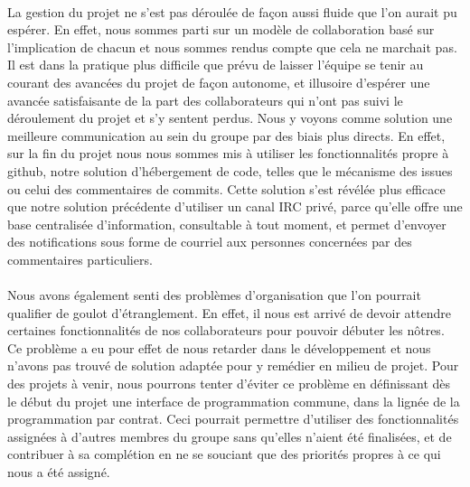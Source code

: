     \paragraph{}
        La gestion du projet ne s'est pas déroulée de façon aussi fluide que 
        l'on aurait pu espérer. En effet, nous sommes parti sur un modèle de 
        collaboration basé sur l'implication de chacun et nous sommes rendus
        compte que cela ne marchait pas. Il est dans la pratique plus difficile
        que prévu de laisser l'équipe se tenir au courant des avancées du
        projet de façon autonome, et illusoire d'espérer une avancée 
        satisfaisante de la part des collaborateurs qui n'ont pas suivi le 
        déroulement du projet et s'y sentent perdus. Nous y voyons comme 
        solution une meilleure communication au sein du groupe par des biais
        plus directs. En effet, sur la fin du projet nous nous sommes mis à
        utiliser les fonctionnalités propre à github, notre solution 
        d'hébergement de code, telles que le mécanisme des issues ou celui des
        commentaires de commits. Cette solution s'est révélée plus efficace que
        notre solution précédente d'utiliser un canal IRC privé, parce qu'elle
        offre une base centralisée d'information, consultable à tout moment,
        et permet d'envoyer des notifications sous forme de courriel aux
        personnes concernées par des commentaires particuliers.

    \paragraph{}
        Nous avons également senti des problèmes d'organisation que l'on 
        pourrait qualifier de goulot d'étranglement.
        En effet, il nous est arrivé de devoir attendre certaines
        fonctionnalités de nos collaborateurs pour pouvoir débuter les nôtres.
        Ce problème a eu pour effet de nous retarder dans le développement et
        nous n'avons pas trouvé de solution adaptée pour y remédier en milieu
        de projet.
        Pour des projets à venir, nous pourrons tenter d'éviter ce problème en
        définissant dès le début du projet une interface de programmation
        commune, dans la lignée de la programmation par contrat.
        Ceci pourrait permettre d'utiliser des fonctionnalités assignées à 
        d'autres membres du groupe sans qu'elles n'aient été finalisées, et de
        contribuer à sa complétion en ne se souciant que des priorités propres
        à ce qui nous a été assigné.


